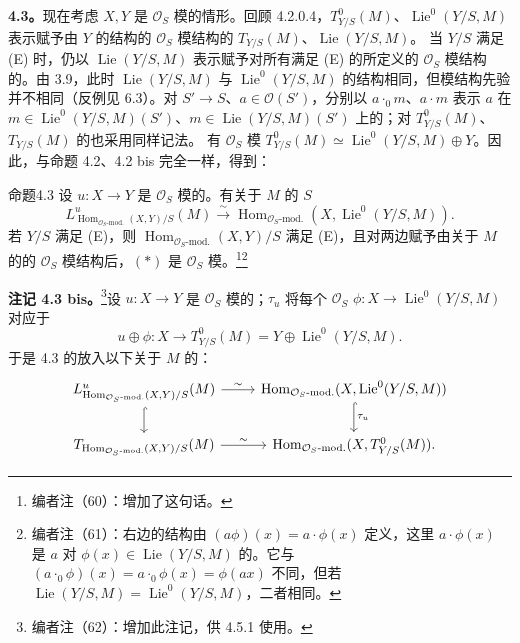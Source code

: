 \textbf{4.3。}现在考虑 $X,Y$ 是 $\mathcal O_S$ 模的情形。回顾 4.2.0.4，$T^0_{Y/S}(M)$、$\operatorname{Lie}^0(Y/S,M)$ 表示赋予由 $Y$ 的结构的 $\mathcal O_S$ 模结构的 $T_{Y/S}(M)$、$\operatorname{Lie}(Y/S,M)$。
当 $Y/S$ 满足 (E) 时，仍以 $\operatorname{Lie}(Y/S,M)$ 表示赋予对所有满足 (E) 的所定义的 $\mathcal O_S$ 模结构的。由 3.9，此时 $\operatorname{Lie}(Y/S,M)$ 与 $\operatorname{Lie}^0(Y/S,M)$ 的结构相同，但模结构先验并不相同（反例见 6.3）。对 $S'\to S$、$a\in\mathcal O(S')$，分别以 $a\cdot_0m$、$a\cdot m$ 表示 $a$ 在 $m\in\operatorname{Lie}^0(Y/S,M)(S')$、$m\in\operatorname{Lie}(Y/S,M)(S')$ 上的；对 $T^0_{Y/S}(M)$、$T_{Y/S}(M)$ 的也采用同样记法。
有 $\mathcal O_S$ 模 $T^0_{Y/S}(M)\simeq\operatorname{Lie}^0(Y/S,M)\oplus Y$。因此，与命题 4.2、4.2 bis 完全一样，得到：
\begin{SGAresult}{命题}{4.3}
设 $u:X\to Y$ 是 $\mathcal O_S$ 模的。有关于 $M$ 的 $S$ 
\[L^u_{\operatorname{Hom}_{\mathcal O_S\text{-mod.}}(X,Y)/S}(M)\xrightarrow{\sim}\operatorname{Hom}_{\mathcal O_S\text{-mod.}}(X,\operatorname{Lie}^0(Y/S,M)).\tag{*}\]
若 $Y/S$ 满足 (E)，则 $\operatorname{Hom}_{\mathcal O_S\text{-mod.}}(X,Y)/S$ 满足 (E)，且对两边赋予由关于 $M$ 的的 $\mathcal O_S$ 模结构后，$(*)$ 是 $\mathcal O_S$ 模。\footnote{编者注（60）：增加了这句话。}\footnote{编者注（61）：右边的结构由 $(a\phi)(x)=a\cdot\phi(x)$ 定义，这里 $a\cdot\phi(x)$ 是 $a$ 对 $\phi(x)\in\operatorname{Lie}(Y/S,M)$ 的。它与 $(a\cdot_0\phi)(x)=a\cdot_0\phi(x)=\phi(ax)$ 不同，但若 $\operatorname{Lie}(Y/S,M)=\operatorname{Lie}^0(Y/S,M)$，二者相同。}
\end{SGAresult}
\textbf{注记 4.3 bis。}\footnote{编者注（62）：增加此注记，供 4.5.1 使用。}设 $u:X\to Y$ 是 $\mathcal O_S$ 模的；$\tau_u$ 将每个 $\mathcal O_S$  $\phi:X\to\operatorname{Lie}^0(Y/S,M)$ 对应于
\[u\oplus\phi:X\to T^0_{Y/S}(M)=Y\oplus\operatorname{Lie}^0(Y/S,M).\]
于是 4.3 的放入以下关于 $M$ 的：
\[\begin{tikzcd}
L^u_{\operatorname{Hom}_{\mathcal O_S\text{-mod.}}(X,Y)/S}(M)\arrow[r,"\sim"]\arrow[d,hook]&\operatorname{Hom}_{\mathcal O_S\text{-mod.}}(X,\operatorname{Lie}^0(Y/S,M))\arrow[d,hook,"\tau_u"]\\
T_{\operatorname{Hom}_{\mathcal O_S\text{-mod.}}(X,Y)/S}(M)\arrow[r,"\sim"]&\operatorname{Hom}_{\mathcal O_S\text{-mod.}}(X,T^0_{Y/S}(M)).
\end{tikzcd}\]
